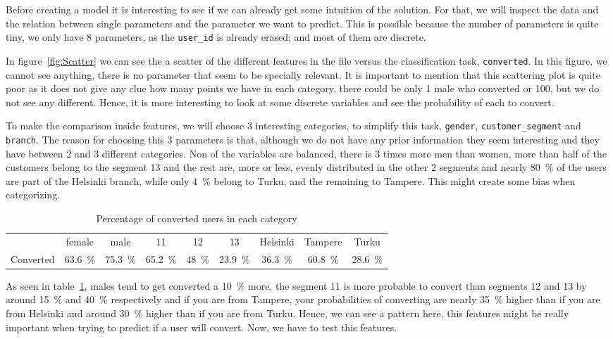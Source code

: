 \documentclass{article}
\begin{document}
Before creating a model it is interesting to see if we can already get some intuition of the solution. For that, we will inspect the data and the relation between single parameters and the parameter we want to predict. This is possible because the number of parameters is quite tiny, we only have 8 parameters, as the \texttt{user\_id} is already erased; and most of them are discrete.

In figure~\ref{fig:Scatter} we can see the a scatter of the different features in the file versus the classification task, \texttt{converted}. In this figure, we cannot see anything, there is no parameter that seem to be specially relevant. It is important to mention that this scattering plot is quite poor as it does not give any clue how many points we have in each category, there could be only 1 male who converted or 100, but we do not see any different. Hence, it is more interesting to look at some discrete variables and see the probability of each to convert.

To make the comparison inside features, we will choose 3 interesting categories, to simplify this task, \texttt{gender}, \texttt{customer\_segment} and \texttt{branch}. The reason for choosing this 3 parameters is that, although we do not have any prior information they seem interesting and they have between 2 and 3 different categories. Non of the variables are balanced, there is 3 times more men than women, more than half of the customers belong to the segment 13 and the rest are, more or less, evenly distributed in the other 2 segments and nearly 80~\% of the users are part of the Helsinki branch, while only 4~\% belong to Turku, and the remaining to Tampere. This might create some bias when categorizing. 

\begin{table}[!h]
\begin{center}
\begin{tabular}{ c | c  c | c c c | c c c}
  & female & male & 11 & 12 & 13 & Helsinki & Tampere & Turku \\ 
 Converted & 63.6~\% & 75.3~\% &  65.2~\% & 48~\% & 23.9~\% & 36.3~\% & 60.8~\% & 28.6~\%    
\end{tabular}
\caption{\label{tab:perc}Percentage of converted users in each category}
\end{center}
\end{table}

As seen in table~\ref{tab:perc}, males tend to get converted a 10~\% more, the segment 11 is more probable to convert than segments 12 and 13 by around 15~\% and 40~\% respectively and if you are from Tampere, your probabilities of converting are nearly 35~\% higher than if you are from Helsinki and around 30~\% higher than if you are from Turku. Hence, we can see a pattern here, this features might be really important when trying to predict if a user will convert. Now, we have to test this features.
\end{document}
